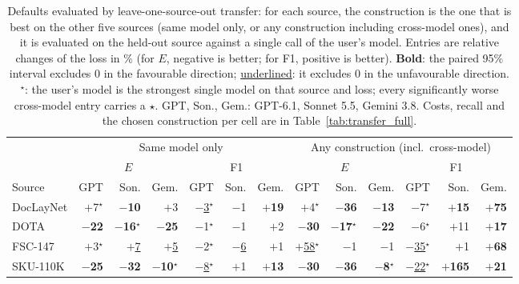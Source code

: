 \begin{table}[tp]\centering\footnotesize\setlength{\tabcolsep}{3pt}
\caption{Defaults evaluated by leave-one-source-out transfer: for each source, the construction is the one that is best on the other five sources (same model only, or any construction including cross-model ones), and it is evaluated on the held-out source against a single call of the user's model. Entries are relative changes of the loss in \% (for $E$, negative is better; for F1, positive is better). \textbf{Bold}: the paired 95\% interval excludes 0 in the favourable direction; \underline{underlined}: it excludes 0 in the unfavourable direction. $^{\star}$: the user's model is the strongest single model on that source and loss; every significantly worse cross-model entry carries a $\star$. GPT, Son., Gem.: GPT-6.1, Sonnet 5.5, Gemini 3.8. Costs, recall and the chosen construction per cell are in Table~\ref{tab:transfer_full}.}\label{tab:transfer}
\begin{tabular}{@{}lrrrrrrrrrrrr@{}}\toprule
& \multicolumn{6}{c}{Same model only} & \multicolumn{6}{c}{Any construction (incl.\ cross-model)} \\\cmidrule(lr){2-7}\cmidrule(l){8-13}
& \multicolumn{3}{c}{$E$} & \multicolumn{3}{c}{F1} & \multicolumn{3}{c}{$E$} & \multicolumn{3}{c}{F1} \\\cmidrule(lr){2-4}\cmidrule(lr){5-7}\cmidrule(lr){8-10}\cmidrule(l){11-13}
Source & GPT & Son. & Gem. & GPT & Son. & Gem. & GPT & Son. & Gem. & GPT & Son. & Gem. \\\midrule
DocLayNet & $+$7$^{\star}$ & {\bfseries\boldmath $-$10} & $+$3 & \underline{$-$3}$^{\star}$ & $-$1 & {\bfseries\boldmath $+$19} & $+$4$^{\star}$ & {\bfseries\boldmath $-$36} & {\bfseries\boldmath $-$13} & $-$7$^{\star}$ & {\bfseries\boldmath $+$15} & {\bfseries\boldmath $+$75} \\
DOTA & {\bfseries\boldmath $-$22} & {\bfseries\boldmath $-$16}$^{\star}$ & {\bfseries\boldmath $-$25} & $-$1$^{\star}$ & $-$1 & $+$2 & {\bfseries\boldmath $-$30} & {\bfseries\boldmath $-$17}$^{\star}$ & {\bfseries\boldmath $-$22} & $-$6$^{\star}$ & $+$11 & {\bfseries\boldmath $+$17} \\
FSC-147 & $+$3$^{\star}$ & \underline{$+$7} & \underline{$+$5} & $-$2$^{\star}$ & \underline{$-$6} & $+$1 & \underline{$+$58}$^{\star}$ & $-$1 & $-$1 & \underline{$-$35}$^{\star}$ & $+$1 & {\bfseries\boldmath $+$68} \\
SKU-110K & {\bfseries\boldmath $-$25} & {\bfseries\boldmath $-$32} & {\bfseries\boldmath $-$10}$^{\star}$ & \underline{$-$8}$^{\star}$ & $+$1 & {\bfseries\boldmath $+$13} & {\bfseries\boldmath $-$30} & {\bfseries\boldmath $-$36} & {\bfseries\boldmath $-$8}$^{\star}$ & \underline{$-$22}$^{\star}$ & {\bfseries\boldmath $+$165} & {\bfseries\boldmath $+$21} \\

\end{tabular}
\end{table}
